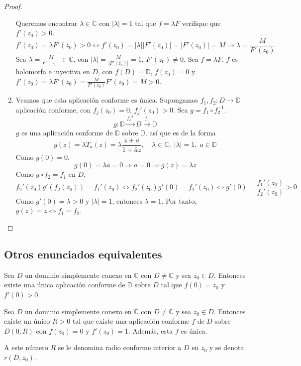 \begin{proof}
\begin{enumerate}
              Queremos encontrar $\lambda \in \mathbb{C}$ con $|\lambda| = 1$ tal que $f = \lambda F$ verifique que $f'(z_0) > 0$.
              $$f'(z_0) = \lambda F'(z_0) > 0 \Leftrightarrow f'(z_0) = |\lambda||F'(z_0)| = |F'(z_0)| = M \Rightarrow \lambda = \frac{M}{F'(z_0)}$$
              Sea $\lambda = \frac{M}{F'(z_0)} \in \mathbb{C}$, con $|\lambda| = \frac{M}{|F'(z_0)|} = 1$, $F'(z_0) \neq 0$.
              Sea $f = \lambda F$.
              $f$ es holomorfa e inyectiva en $D$, con $f(D) = \mathbb{D}$, $f(z_0) = 0$ y $f'(z_0) = \lambda F'(z_0) = \frac{M}{F'(z_0)}F'(z_0) = M > 0$.

        \item Veamos que esta aplicación conforme es única.
              Supongamos $f_1, f_2: D \to \mathbb{D}$ aplicación conforme, con $f_j(z_0) = 0$, $f_j'(z_0) > 0$.
              Sea $g = f_1 \circ f_2^{-1}$.
              $$g: \mathbb{D} \xrightarrow{f_2^{-1}} D \xrightarrow{f_1} \mathbb{D}$$
              $g$ es una aplicación conforme de $\mathbb{D}$ sobre $\mathbb{D}$, así que es de la forma
              $$g(z) = \lambda T_a(z) = \lambda \frac{z+a}{1+\bar{a}z}, \quad \lambda \in \mathbb{C}, \; |\lambda| = 1, \; a \in \mathbb{D}$$
              Como $g(0) = 0$,
              $$g(0) = \lambda a = 0 \Rightarrow a = 0 \Rightarrow g(z) = \lambda z$$
              Como $g \circ f_2 = f_1$ en $D$,
              $$f_2'(z_0)g'(f_2(z_0)) = f_1'(z_0) \Leftrightarrow f_2'(z_0)g'(0) = f_1'(z_0) \Leftrightarrow g'(0) = \frac{f_1'(z_0)}{f_2'(z_0)} > 0$$
              Como $g'(0) = \lambda > 0$ y $|\lambda| = 1$, entonces $\lambda = 1$.
              Por tanto, $g(z) = z \Leftrightarrow f_1 = f_2$.
    \end{enumerate}
\end{proof}

\subsection*{Otros enunciados equivalentes}
\begin{theorem}
    Sea $D$ un dominio simplemente conexo en $\mathbb{C}$ con $D \neq \mathbb{C}$ y sea $z_0 \in D$.
    Entonces existe una única aplicación conforme de $\mathbb{D}$ sobre $D$ tal que $f(0) = z_0$ y $f'(0) > 0$.
\end{theorem}


\begin{theorem}
    Sea $D$ un dominio simplemente conexo en $\mathbb{C}$ con $D \neq \mathbb{C}$ y sea $z_0 \in D$.
    Entonces existe un único $R > 0$ tal que existe una aplicación conforme $f$ de $D$ sobre $D(0, R)$ con $f(z_0) = 0$ y $f'(z_0) = 1$.
    Además, esta $f$ es única.

    A este número $R$ se le denomina radio conforme interior a $D$ en $z_0$ y se denota $r(D, z_0)$.
\end{theorem}


